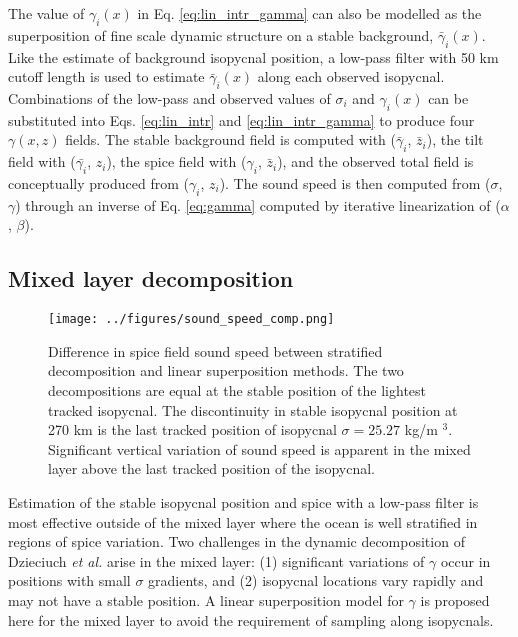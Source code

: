 \documentclass[preprint,NumberedRefs]{JASA}
\begin{document}
The value of $\gamma_i(x)$ in Eq. \eqref{eq:lin_intr_gamma} can also be modelled as the superposition of fine scale dynamic structure on a stable background, $\bar{\gamma}_i(x)$. Like the estimate of background isopycnal position, a low-pass filter with 50 km cutoff length is used to estimate $\bar{\gamma}_i(x)$ along each observed isopycnal. Combinations of the low-pass and observed values of $\sigma_i$ and $\gamma_i(x)$ can be substituted into Eqs. \eqref{eq:lin_intr} and \eqref{eq:lin_intr_gamma} to produce four $\gamma(x,z)$ fields. The stable background field is computed with ($\bar{\gamma}_i$, $\bar{z}_i$), the tilt field with ($\bar{\gamma_i}$, $z_i$), the spice field with ($\gamma_i$, $\bar{z}_i$), and the observed total field is conceptually produced from ($\gamma_i$, $z_i$). The sound speed is then computed from ($\sigma$, $\gamma$) through an inverse of Eq. \eqref{eq:gamma} computed by iterative linearization of ($\alpha$, $\beta$).


\subsection{Mixed layer decomposition}\label{ssec:ml_decomp}
\begin{figure}
\texttt{[image: ../figures/sound\_speed\_comp.png]}
    \caption{\label{fig:c_diff}{Difference in spice field sound speed between stratified decomposition and linear superposition methods. The two decompositions are equal at the stable position of the lightest tracked isopycnal. The discontinuity in stable isopycnal position at 270 km is the last tracked position of isopycnal $\sigma=25.27$ kg/m $^3$. Significant vertical variation of sound speed is apparent in the mixed layer above the last tracked position of the isopycnal.}}
\end{figure}

Estimation of the stable isopycnal position and spice with a low-pass filter is most effective outside of the mixed layer where the ocean is well stratified in regions of spice variation. Two challenges in the dynamic decomposition of Dzieciuch \emph{et al.}\citep{dzieciuch2004} arise in the mixed layer: (1) significant variations of $\gamma$ occur in positions with small $\sigma$ gradients, and (2) isopycnal locations vary rapidly and may not have a stable position. A linear superposition model for $\gamma$ is proposed here for the mixed layer to avoid the requirement of sampling along isopycnals.
\end{document}
